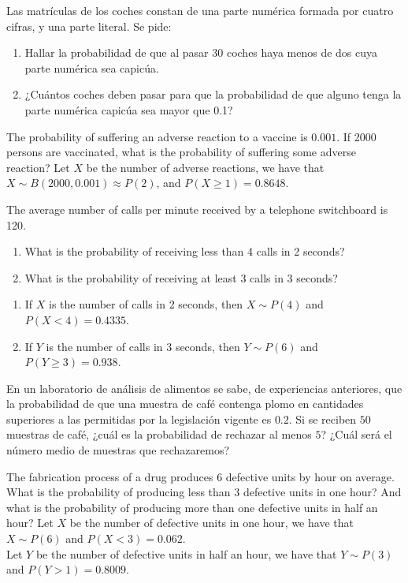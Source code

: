 {Las matrículas de los coches constan de una parte numérica formada por cuatro cifras, y una parte literal. Se pide:

\begin{enumerate}
\item  Hallar la probabilidad de que al pasar 30 coches haya menos de dos cuya parte numérica sea capicúa.
\item  ¿Cuántos coches deben pasar para que la probabilidad de que alguno tenga la parte numérica capicúa sea mayor
que 0.1?
\end{enumerate}
}
{}
{}


{The probability of suffering an adverse reaction to a vaccine is $0.001$. 
If 2000 persons are vaccinated, what is the probability of suffering some adverse reaction?
}
{Let $X$ be the number of adverse reactions, we have that $X\sim B(2000,0.001)\approx P(2)$, and $P(X\geq 1)=0.8648$.
}
{}


{The average number of calls per minute received by a telephone switchboard is 120. 
\begin{enumerate}
\item What is the probability of receiving less than 4 calls in 2 seconds?
\item What is the probability of receiving at least 3 calls in 3 seconds?
\end{enumerate}
}
{
\begin{enumerate}
\item If $X$ is the number of calls in 2 seconds, then $X\sim P(4)$ and $P(X<4)=0.4335$.
\item If $Y$ is the number of calls in 3 seconds, then $Y\sim P(6)$ and $P(Y\geq 3)=0.938$.
\end{enumerate}
}
{}


{En un laboratorio de análisis de alimentos se sabe, de experiencias anteriores, que la probabilidad de que una muestra de café contenga plomo en cantidades superiores a las permitidas por la legislación vigente es $0.2$. Si se reciben $50$ muestras de café, ¿cuál es la probabilidad de rechazar al menos $5$?
¿Cuál será el número medio de muestras que rechazaremos?
}
{}
{}


{The fabrication process of a drug produces 6 defective units by hour on average.
What is the probability of producing less than 3 defective units in one hour?
And what is the probability of producing more than one defective units in half an hour?}
{Let $X$ be the number of defective units in one hour, we have that $X\sim P(6)$ and $P(X<3)=0.062$.\\
Let $Y$ be the number of defective units in half an hour, we have that $Y\sim P(3)$ and $P(Y>1)=0.8009$.}
{}


